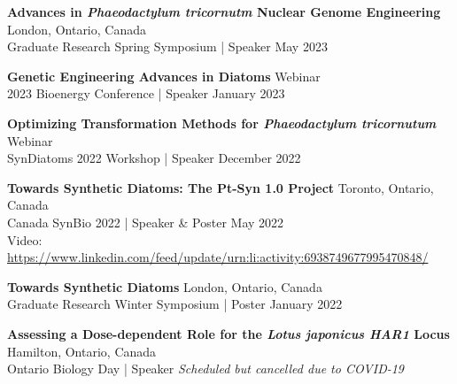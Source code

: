 \documentclass[a4paper,9pt]{extarticle}
\begin{document}
\noindent
\begin{minipage}{1\textwidth}
\setlength{\parindent}{15pt} %
	\noindent
	\textbf{Advances in \textit{Phaeodactylum tricornutm} Nuclear Genome Engineering}  \hfill London, Ontario, Canada\\ 
	Graduate Research Spring Symposium | Speaker  \hfill May 2023\\
\end{minipage}

\noindent
\begin{minipage}{1\textwidth}
\setlength{\parindent}{15pt} %
	\noindent
	\textbf{Genetic Engineering Advances in Diatoms}  \hfill Webinar\\ 
	2023 Bioenergy Conference | Speaker  \hfill January 2023\\
\end{minipage}

\noindent
\begin{minipage}{1\textwidth}
\setlength{\parindent}{15pt} %
	\noindent
	\textbf{Optimizing Transformation Methods for \textit{Phaeodactylum tricornutum}}  \hfill Webinar\\ 
	SynDiatoms 2022 Workshop | Speaker  \hfill December 2022\\
\end{minipage}

\noindent
\begin{minipage}{1\textwidth}
\setlength{\parindent}{15pt} %
	\noindent
	\textbf{Towards Synthetic Diatoms: The Pt-Syn 1.0 Project}  \hfill Toronto, Ontario, Canada\\ 
	Canada SynBio 2022 | Speaker \& Poster  \hfill May 2022\\
	Video: \href{https://www.linkedin.com/feed/update/urn:li:activity:6938749677995470848/}{https://www.linkedin.com/feed/update/urn:li:activity:6938749677995470848/}\\
\end{minipage}

\noindent
\begin{minipage}{1\textwidth}
\setlength{\parindent}{15pt} %
	\noindent
	\textbf{Towards Synthetic Diatoms}  \hfill London, Ontario, Canada\\ 
	Graduate Research Winter Symposium | Poster  \hfill January 2022\\
\end{minipage}

\noindent
\begin{minipage}{1\textwidth}
\setlength{\parindent}{15pt} %
	\noindent
	\textbf{Assessing a Dose-dependent Role for the \textit{Lotus japonicus HAR1} Locus}  \hfill Hamilton, Ontario, Canada\\ 
	Ontario Biology Day | Speaker \hfill \textit{Scheduled but cancelled due to COVID-19}
\end{minipage}
\end{document}
